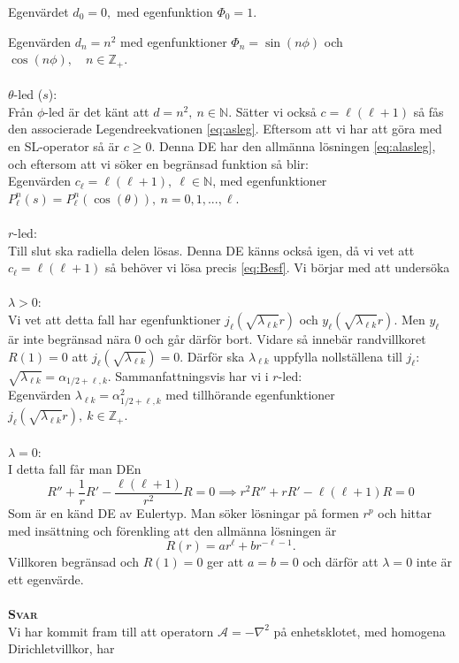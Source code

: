 \documentclass{article}
\begin{document}
Egenvärdet $d_0=0,$ med egenfunktion $\Phi_0=1$.

Egenvärden $d_n=n^2$ med egenfunktioner $\Phi_n=\sin(n\phi)$ och $\cos(n\phi), \quad n\in\mathbb{Z}_+$.\\ \\
\newpage
\noindent
$\theta$-led ($s$):\\
Från $\phi$-led är det känt att $d=n^2, \ n\in\mathbb{N}$. Sätter vi också $c=\ell(\ell+1)$ så fås den associerade Legendreekvationen \eqref{eq:asleg}. Eftersom att vi har att göra med en SL-operator så är $c\geq 0$. Denna DE har den allmänna lösningen \eqref{eq:alasleg}, och eftersom att vi söker en begränsad funktion så blir:\\

Egenvärden $c_{\ell}=\ell(\ell+1), \ \ell\in\mathbb{N}$, med egenfunktioner $P_{\ell}^n(s)=P_{\ell}^n(\cos(\theta)), \ n=0,1,...,\ell$.\\ \\
$r$-led:\\
Till slut ska radiella delen lösas. Denna DE känns också igen, då vi vet att $c_{\ell}=\ell(\ell+1)$ så behöver vi lösa precis \eqref{eq:Besf}. Vi börjar med att undersöka\\ \\
$\lambda>0$:\\
Vi vet att detta fall har egenfunktioner $j_{\ell}(\sqrt{\lambda_{\ell k}}r)$ och $y_{\ell}(\sqrt{\lambda_{\ell k}}r)$. Men $y_{\ell}$ är inte begränsad nära $0$ och går därför bort. Vidare så innebär randvillkoret $R(1)=0$ att $j_{\ell}(\sqrt{\lambda_{\ell k}})=0$. Därför ska $\lambda_{\ell k}$ uppfylla nollställena till $j_{\ell}$: $\sqrt{\lambda_{\ell k}}=\alpha_{1/2+\ell,k}$. Sammanfattningsvis har vi i $r$-led:\\

Egenvärden $\lambda_{\ell k}=\alpha_{1/2+\ell,k}^2$ med tillhörande egenfunktioner $j_{\ell}(\sqrt{\lambda_{\ell k}}r), \ k\in\mathbb{Z}_+$.\\ \\
$\lambda=0$:\\
I detta fall får man DEn
$$
R''+\frac{1}{r}R'-\frac{\ell(\ell+1)}{r^2}R=0\implies r^2R''+rR'-\ell(\ell+1)R=0
$$
Som är en känd DE av Eulertyp. Man söker lösningar på formen $r^p$ och hittar med insättning och förenkling att den allmänna lösningen är
$$
R(r)=ar^{\ell}+br^{-\ell-1}.
$$
Villkoren begränsad och $R(1)=0$ ger att $a=b=0$ och därför att $\lambda=0$ inte är ett egenvärde.\\ \\
\textbf{\textsc{Svar}}\\
Vi har kommit fram till att operatorn $\mathcal{A}=-\nabla^2$ på enhetsklotet, med homogena Dirichletvillkor, har\\
\end{document}
